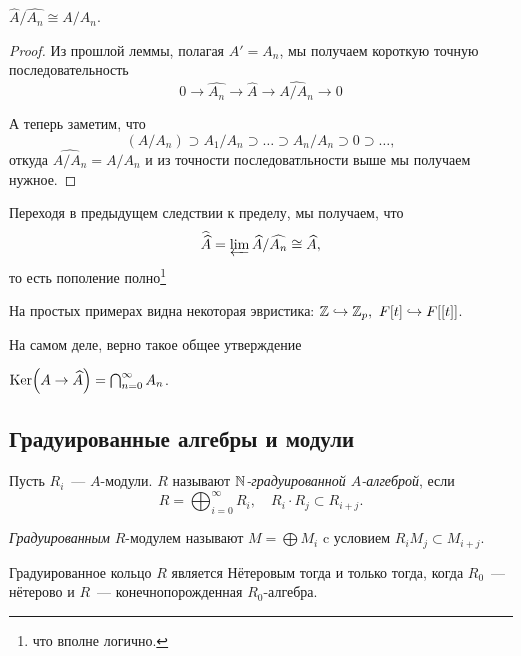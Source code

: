 	\begin{corollary}
		$\widehat{A}/\widehat{A_n} \cong A/A_n$.
	\end{corollary}
	\begin{proof}
		Из прошлой леммы, полагая $A' = A_n$, мы получаем короткую точную последовательность 
		\[
			0 \to \widehat{A_n} \to \widehat{A} \to \widehat{A/A_n} \to 0
		\]

		А теперь заметим, что 
		\[
			(A/A_n) \supset A_1 / A_n \supset \ldots \supset A_n/A_n \supset 0 \supset \ldots, 
		\]
		откуда $\widehat{A/A_n} = A/A_n$ и из точности последоватльности выше мы получаем нужное. 
	\end{proof}

	\begin{corollary}
		Переходя в предыдущем следствии к пределу, мы получаем, что 
		\[
			\widehat{\widehat{A}} = \varprojlim \widehat{A}/\widehat{A_n} \cong \widehat{A},
		\]
		то есть пополение полно\footnote{что вполне логично. }
	\end{corollary}

	\begin{example}
		На простых примерах видна некоторая эвристика: $\mathbb{Z} \hookrightarrow \mathbb{Z}_{p}, \ F[t] \hookrightarrow F[[t]]$.
	\end{example}

	На самом деле, верно такое общее утверждение 
	
	\begin{theorem} 
		$\Ker\lr*{A \to \widehat{A}} = \bigcap_{n = 0}^{\infty} A_n$. 
	\end{theorem}

	\subsection{Градуированные алгебры и модули}

	\begin{definition} 
		Пусть $R_i$~--- $A$-модули. $R$ называют \emph{$\mathbb{N}$-градуированной $A$-алгеброй}, если 
		\[
			R = \bigoplus_{i = 0}^{\infty} R_i, \quad R_i \cdot R_j \subset  R_{i + j}.		
	 	\] 	

	 	\emph{Градуированным} $R$-модулем называют $M = \bigoplus M_i$ c условием $R_i M_j \subset M_{i + j}$.
	\end{definition}

	\begin{statement} 
		Градуированное кольцо $R$ является Нётеровым тогда и только тогда, когда $R_0$~--- нётерово и $R$~--- конечнопорожденная $R_0$-алгебра. 
	\end{statement}

